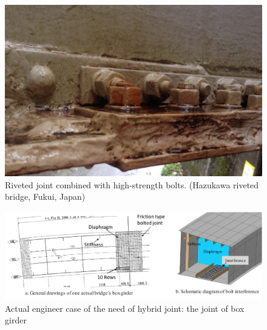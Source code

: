 %
\begin{figure}[ht]
    \centering
    \includegraphics[width=0.75\linewidth]{imgs//ch2/bridge-rivet-HSB.jpg}
    \caption{Riveted joint combined with high-strength bolts. (Hazukawa riveted bridge, Fukui, Japan)}
    \label{fig-bridrivhsb}
\end{figure}


%
\begin{figure}[ht]
    \centering
    \includegraphics[width=1\linewidth]{imgs//ch2/boxhsbinter.pdf}
    \caption{Actual engineer case of the need of hybrid joint: the joint of box girder}
    \label{fig-boxhsbinter}
\end{figure}

